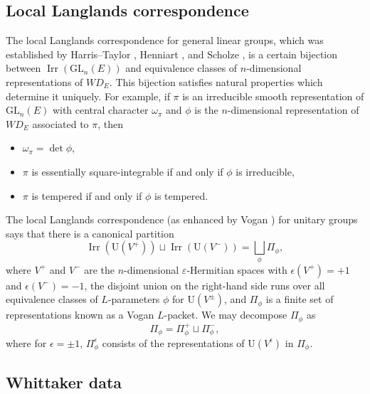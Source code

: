\documentclass[11pt]{amsart}
\numberwithin{equation}{section}
\theoremstyle{plain}
\theoremstyle{definition}
\theoremstyle{remark}
\def\Irr{\operatorname{Irr}}
\def\GL{\mathrm{GL}}
\def\U{\mathrm{U}}
\def\WD{\mathit{WD}}
\begin{document}
\subsection{Local Langlands correspondence}

The local Langlands correspondence for general linear groups, which was established by Harris--Taylor \cite{ht}, Henniart \cite{he}, and Scholze \cite{scholze}, is a certain bijection between $\Irr(\GL_n(E))$ and equivalence classes of $n$-dimensional representations of $\WD_E$.
This bijection satisfies natural properties which determine it uniquely.
For example, if $\pi$ is an irreducible smooth representation of $\GL_n(E)$ with central character $\omega_{\pi}$ and $\phi$ is the $n$-dimensional representation of $\WD_E$ associated to $\pi$, then 
\begin{itemize}
 \item $\omega_\pi = \det \phi$,
 \item $\pi$ is essentially square-integrable if and only if $\phi$ is irreducible,
 \item $\pi$ is tempered if and only if $\phi$ is tempered.
\end{itemize}

The local Langlands correspondence (as enhanced by Vogan \cite{v}) for unitary groups says that there is a canonical partition
\[  \Irr(\U(V^+)) \sqcup \Irr(\U(V^-))   =  \bigsqcup_{\phi}  \Pi_{\phi}, \]
where $V^+$ and $V^-$ are the $n$-dimensional $\varepsilon$-Hermitian spaces
with $\epsilon(V^+) = +1$ and $\epsilon(V^-) = -1$,
the disjoint union on the right-hand side runs over all equivalence classes of $L$-parameters $\phi$ for $\U(V^\pm)$, and $\Pi_{\phi}$ is a finite set of representations known as a Vogan $L$-packet.
We may decompose $\Pi_{\phi}$ as 
\[  \Pi_{\phi}  = \Pi_{\phi}^+\sqcup   \Pi_{\phi}^-, \]
where for $\epsilon = \pm 1$, $\Pi_{\phi}^{\epsilon}$ consists of the representations of $\U(V^{\epsilon})$ in $\Pi_{\phi}$.

\subsection{Whittaker data}
\end{document}
